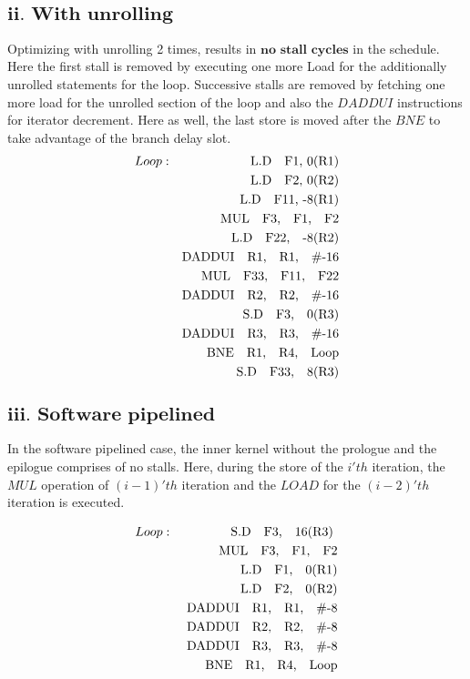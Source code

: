 \documentclass{tufte-handout}
\begin{document}
	\subsection{$\textbf{ii.\ With unrolling}$}
	Optimizing with unrolling 2 times, results in $\textbf{no stall cycles}$ in the schedule. Here the first stall is removed by executing one more Load for the additionally unrolled statements for the loop. Successive stalls are removed by fetching one more load for the unrolled section of the loop and also the $DADDUI$ instructions for iterator decrement. Here as well, the last store is moved after the $BNE$ to take advantage of the branch delay slot.
		\begin{eqnarray*}
			Loop : & & \mbox{L.D\quad F1, 0(R1)} \\
			       & & \mbox{L.D\quad F2, 0(R2)} \\
			       & & \mbox{L.D\quad F11, -8(R1)} \\
			       & & \mbox{MUL\quad F3,\quad F1,\quad F2} \\
			       & & \mbox{L.D\quad F22,\quad -8(R2)} \\
			       & & \mbox{DADDUI\quad R1,\quad R1,\quad \#-16} \\
			       & & \mbox{MUL\quad F33,\quad F11,\quad F22} \\
			       & & \mbox{DADDUI\quad R2,\quad R2,\quad \#-16} \\
			       & & \mbox{S.D\quad F3,\quad 0(R3)} \\
			       & & \mbox{DADDUI\quad R3,\quad R3,\quad \#-16} \\
			       & & \mbox{BNE\quad R1,\quad R4,\quad Loop} \\
			       & & \mbox{S.D\quad F33,\quad 8(R3)} \\
		\end{eqnarray*}

	\subsection{$\textbf{iii.\ Software pipelined}$}
	In the software pipelined case, the inner kernel without the prologue and the epilogue comprises of no stalls. Here, during the store of the $i'th$ iteration, the $MUL$ operation of $(i-1)'th$ iteration and the $LOAD$ for the $(i-2)'th$ iteration is executed.  

	\begin{eqnarray*}
		Loop : & & \mbox{ S.D\quad F3,\quad 16(R3) } \\
		       & & \mbox{ MUL\quad F3,\quad F1,\quad F2} \\
		       & & \mbox{ L.D\quad F1,\quad 0(R1)} \\
		       & & \mbox{ L.D\quad F2,\quad 0(R2)} \\
		       & & \mbox{ DADDUI\quad R1,\quad R1,\quad \#-8} \\
		       & & \mbox{ DADDUI\quad R2,\quad R2,\quad \#-8} \\
		       & & \mbox{ DADDUI\quad R3,\quad R3,\quad \#-8} \\
		       & & \mbox{ BNE\quad R1,\quad R4,\quad Loop} \\
	\end{eqnarray*}
\end{document}
